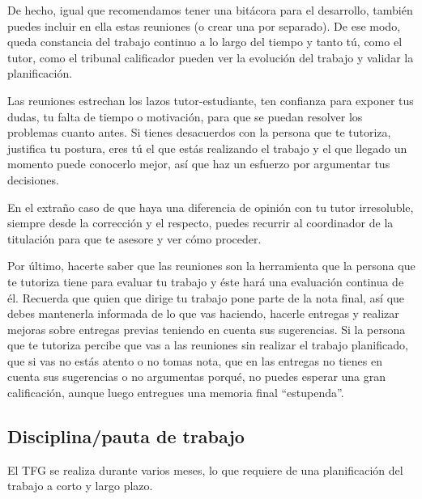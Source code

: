 De hecho, igual que recomendamos tener una bitácora para el desarrollo, también puedes incluir en ella estas reuniones (o crear una por separado). De ese modo, queda constancia del trabajo continuo a lo largo del tiempo y tanto tú, como el tutor, como el tribunal calificador pueden ver la evolución del trabajo y validar la planificación.

Las reuniones estrechan los lazos tutor-estudiante, ten confianza para exponer tus dudas, tu falta de tiempo o motivación, para que se puedan resolver los problemas cuanto antes. Si tienes desacuerdos con la persona que te tutoriza, justifica tu postura, eres tú el que estás realizando el trabajo y el que llegado un momento puede conocerlo mejor, así que haz un esfuerzo por argumentar tus decisiones. 

En el extraño caso de que haya una diferencia de opinión con tu tutor irresoluble, siempre desde la corrección y el respecto, puedes recurrir al coordinador de la titulación para que te asesore y ver cómo proceder. 


Por último, hacerte saber que las reuniones son la herramienta que la persona que te tutoriza tiene para evaluar tu trabajo y éste hará una evaluación continua de él. Recuerda que quien que dirige tu trabajo pone parte de la nota final, así que debes mantenerla informada de lo que vas haciendo, hacerle entregas y realizar mejoras sobre entregas previas teniendo en cuenta sus sugerencias. Si la persona que te tutoriza percibe que vas a las reuniones sin realizar el trabajo planificado, que si vas no estás atento o no tomas nota, que en las entregas no tienes en cuenta sus sugerencias o no argumentas porqué, no puedes esperar una gran calificación, aunque luego entregues una memoria final ``estupenda''.

\subsection{Disciplina/pauta de trabajo}%

El TFG se realiza durante varios meses, lo que requiere de una planificación del trabajo a corto y largo plazo. 

